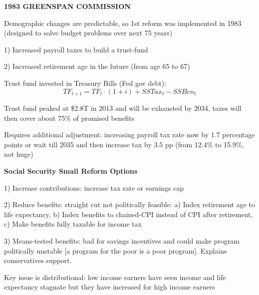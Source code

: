 \documentclass[landscape]{slides}
\begin{document}
\begin{slide}

\end{slide}

\begin{slide}
\begin{center}
{\bf 1983 GREENSPAN COMMISSION}
\end{center}

Demographic changes are predictable, so 1st reform was implemented
in 1983 (designed to solve budget problems over next 75 years)

1) Increased payroll taxes to build a trust-fund

2) Increased retirement age in the future (from age 65 to 67)

Trust fund invested in Treasury Bills (Fed gov debt):
\[ TF_{t+1}=TF_{t} \cdot (1+i)+SSTax_t-SSBen_t \]

Trust fund peaked at \$2.8T in 2013 and will be exhausted by
2034, taxes will then cover about 75\%
of promised benefits


Requires additional adjustment: increasing payroll tax rate now by 1.7 percentage points or wait
till 2035 and then increase tax by 3.5 pp (from 12.4\% to 15.9\%, not huge)

\end{slide}


\begin{slide}

\end{slide}


\begin{slide}
\begin{center}
{\bf Social Security Small Reform Options}
\end{center}

1) Increase contributions: increase tax rate or earnings cap

2) Reduce benefits: straight cut not politically feasible: a) Index retirement age to
life expectancy, b) Index benefits to chained-CPI instead of
CPI after retirement, c) Make benefits fully taxable for income tax



3) Means-tested benefits: bad for savings incentives and could
make program politically unstable [a program for the poor is a
poor program]. Explains conservatives support.



Key issue is distributional: low income earners have seen income and life expectancy stagnate
but they have increased for high income earners 


\end{slide}
\end{document}
